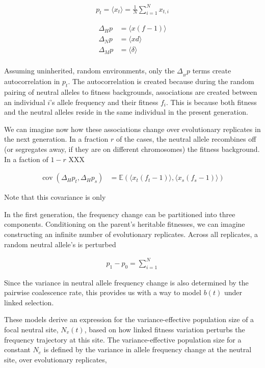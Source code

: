 \documentclass[11pt]{article}
\newcommand{\E}{\mathbb{E}}
\DeclareMathOperator{\cov}{cov}
\begin{document}
\begin{align}
  p_t = \langle x_t \rangle = \frac{1}{N} \sum_{i=1}^N x_{t,i}
\end{align}


\begin{align}
  \Delta_H p &= \langle x (f-1) \rangle \\
  \Delta_N p &= \langle x d \rangle \\
  \Delta_M p &= \langle \delta \rangle \\
\end{align}

Assuming uninherited, random environments, only the $\Delta_{_H} p$ terms
create autocorrelation in $p_t$. The autocorrelation is created because during
the random pairing of neutral alleles to fitness backgrounds, associations are
created between an individual $i$'s allele frequency and their fitness $f_i$.
This is because both fitness and the neutral alleles reside in the same
individual in the present generation. 

We can imagine now how these associations change over evolutionary replicates
in the next generation. In a fraction $r$ of the cases, the neutral allele 
recombines off (or segregates away, if they are on different chromosomes) the
fitness background. In a faction of $1-r$ XXX

\begin{align}
  \cov(\Delta_H p_t, \Delta_H p_s) &= \E(\langle x_t (f_t-1) \rangle , \langle x_s (f_s-1) \rangle)
\end{align}

Note that this covariance is only 


In the first generation, the frequency change
can be partitioned into three components. Conditioning on the parent's
heritable fitnesses, we can imagine constructing an infinite number of
evolutionary replicates. Across all replicates, a random neutral allele's is
perturbed 

\begin{align}
  p_1 - p_0 = \sum_{i=1}^{N} 
\end{align}



Since the variance in neutral allele frequency change is also determined by the
pairwise coalescence rate, this provides us with a way to model $b(t)$ under
linked selection.




These models derive an expression for the variance-effective population size of
a focal neutral site, $N_v(t)$, based on how linked fitness variation perturbs
the frequency trajectory at this site.  The variance-effective population size
for a constant $N_e$ is defined by the variance in allele frequency change at
the neutral site, over evolutionary replicates, 
\end{document}
